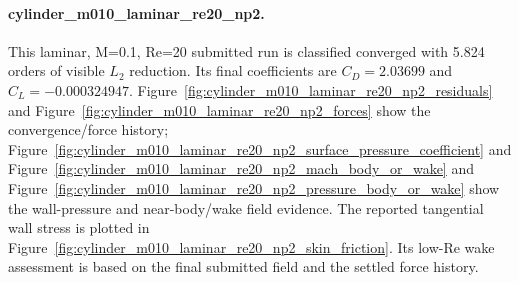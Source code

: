 \paragraph{cylinder\_m010\_laminar\_re20\_np2.} This laminar, M=0.1, Re=20 submitted run is classified converged with 5.824 orders of visible $L_2$ reduction. Its final coefficients are $C_D=2.03699$ and $C_L=-0.000324947$. Figure~\ref{fig:cylinder_m010_laminar_re20_np2_residuals} and Figure~\ref{fig:cylinder_m010_laminar_re20_np2_forces} show the convergence/force history; Figure~\ref{fig:cylinder_m010_laminar_re20_np2_surface_pressure_coefficient} and Figure~\ref{fig:cylinder_m010_laminar_re20_np2_mach_body_or_wake} and Figure~\ref{fig:cylinder_m010_laminar_re20_np2_pressure_body_or_wake} show the wall-pressure and near-body/wake field evidence. The reported tangential wall stress is plotted in Figure~\ref{fig:cylinder_m010_laminar_re20_np2_skin_friction}. Its low-Re wake assessment is based on the final submitted field and the settled force history.
